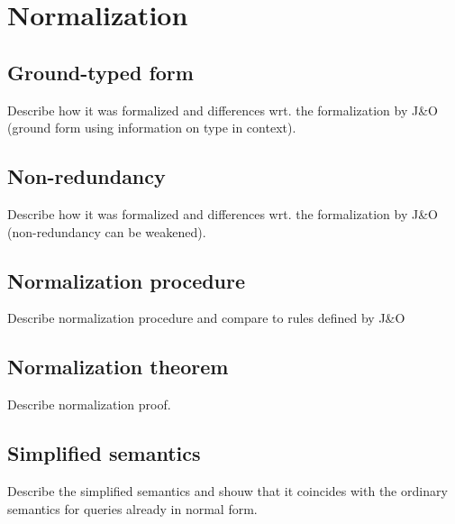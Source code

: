 
\section{Normalization}


\subsection{Ground-typed form}
Describe how it was formalized and differences wrt. the 
formalization by J\&O (ground form using information on type in context).

\subsection{Non-redundancy}
Describe how it was formalized and differences wrt. the
formalization by J\&O (non-redundancy can be weakened).

\subsection{Normalization procedure}

Describe normalization procedure and compare to rules defined by J\&O

\subsection{Normalization theorem}

Describe normalization proof. 

\subsection{Simplified semantics}
Describe the simplified semantics and shouw that it coincides with the ordinary semantics for queries already in normal form. 